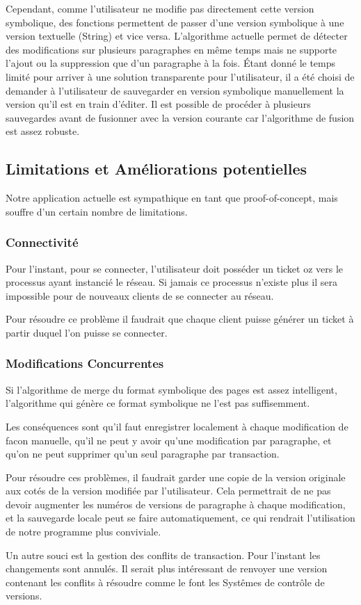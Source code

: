 \documentclass{article}
\begin{document}
	 Cependant, comme l'utilisateur ne modifie pas directement cette version symbolique, des fonctions permettent de passer
	d'une version symbolique à une version textuelle (String) et vice versa.  L'algorithme actuelle permet de détecter
	des modifications sur plusieurs paragraphes en même temps mais ne supporte l'ajout ou la suppression que d'un
	paragraphe à la fois.  Étant donné le temps limité pour arriver à une solution transparente pour l'utilisateur,
	il a été choisi de demander à l'utilisateur de sauvegarder en version symbolique manuellement la version qu'il est 
	en train d'éditer.  Il est possible de procéder à plusieurs sauvegardes avant de fusionner avec la version courante
	car l'algorithme de fusion est assez robuste.
	
	
	\subsection{Limitations et Améliorations potentielles}
	Notre application actuelle est sympathique en tant que proof-of-concept,
	mais souffre d'un certain nombre de limitations.
	\subsubsection{Connectivité} 
		Pour l'instant, pour se connecter, l'utilisateur doit posséder
		un ticket oz vers le processus ayant instancié le réseau.
		Si jamais ce processus n'existe plus il sera impossible pour de
		nouveaux clients de se connecter au réseau. 
		
		Pour résoudre ce problème il faudrait que chaque client puisse
		générer un ticket à partir duquel l'on puisse se connecter.
		
	 \subsubsection{Modifications Concurrentes}
	 	Si l'algorithme de merge du format symbolique des pages est
	 	assez intelligent, l'algorithme qui génère ce format symbolique
	 	ne l'est pas suffisemment. 
	 	
	 	Les conséquences sont qu'il faut enregistrer localement à 
	 	chaque modification de facon manuelle, qu'il ne peut y avoir qu'une modification par
	 	paragraphe, et qu'on ne peut supprimer qu'un seul paragraphe par
	 	transaction. 
	 	
	 	Pour résoudre ces problèmes, il faudrait garder une copie de
	 	la version originale aux cotés de la version modifiée par l'utilisateur.
	 	Cela permettrait de ne pas devoir augmenter les numéros de versions
	 	de paragraphe à chaque modification, et la sauvegarde locale peut
	 	se faire automatiquement, ce qui rendrait l'utilisation de notre
	 	programme plus conviviale. 
	 	
	 	Un autre souci est la gestion des conflits de transaction.
	 	Pour l'instant les changements sont annulés. Il serait plus
	 	intéressant de renvoyer une version contenant les conflits à résoudre
	 	comme le font les Systêmes de contrôle de versions.
\end{document}
